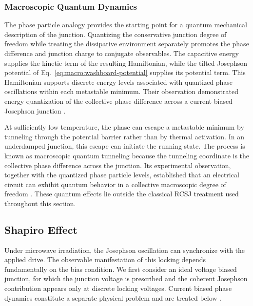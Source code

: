         \subsubsection*{Macroscopic Quantum Dynamics}

            The phase particle analogy provides the starting point for a quantum mechanical description of the junction. Quantizing the conservative junction degree of freedom while treating the dissipative environment separately promotes the phase difference and junction charge to conjugate observables. The capacitive energy supplies the kinetic term of the resulting Hamiltonian, while the tilted Josephson potential of Eq.~\eqref{eq:macro:washboard-potential} supplies its potential term. This Hamiltonian supports discrete energy levels associated with quantized phase oscillations within each metastable minimum. Their observation demonstrated energy quantization of the collective phase difference across a current biased Josephson junction \cite{martinis_energy-level_1985}.

            At sufficiently low temperature, the phase can escape a metastable minimum by tunneling through the potential barrier rather than by thermal activation. In an underdamped junction, this escape can initiate the running state. The process is known as macroscopic quantum tunneling because the tunneling coordinate is the collective phase difference across the junction. Its experimental observation, together with the quantized phase particle levels, established that an electrical circuit can exhibit quantum behavior in a collective macroscopic degree of freedom \cite{devoret_measurements_1985}. These quantum effects lie outside the classical RCSJ treatment used throughout this section.

    \subsection{Shapiro Effect}
    \label{subsec:macro:shapiro}

        Under microwave irradiation, the Josephson oscillation can synchronize with the applied drive. The observable manifestation of this locking depends fundamentally on the bias condition. We first consider an ideal voltage biased junction, for which the junction voltage is prescribed and the coherent Josephson contribution appears only at discrete locking voltages. Current biased phase dynamics constitute a separate physical problem and are treated below \cite{shapiro_josephson_1963,barone_physics_1982}.

